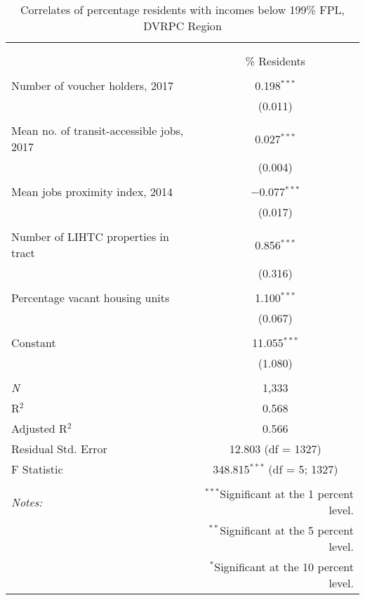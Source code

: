 \documentclass[paper=letterpaper, fontsize=11pt]{scrartcl}
\begin{document}
\begin{table}[!htbp] \centering 
	\caption{Correlates of percentage residents with incomes below 199\% FPL, DVRPC Region} 
		\label{} 
		\begin{tabular}{@{\extracolsep{5pt}}lc} 
			\\[-1.8ex]\hline 
			\hline \\[-1.8ex] 
			\\[-1.8ex] & \% Residents \\ 
			\hline \\[-1.8ex] 
			Number of voucher holders, 2017 & 0.198$^{***}$ \\ 
			& (0.011) \\ 
			& \\ 
			Mean no. of transit-accessible jobs, 2017 & 0.027$^{***}$ \\ 
			& (0.004) \\ 
			& \\ 
			Mean jobs proximity index, 2014 & $-$0.077$^{***}$ \\ 
			& (0.017) \\ 
			& \\ 
			Number of LIHTC properties in tract & 0.856$^{***}$ \\ 
			& (0.316) \\ 
			& \\ 
			Percentage vacant housing units & 1.100$^{***}$ \\ 
			& (0.067) \\ 
			& \\ 
			Constant & 11.055$^{***}$ \\ 
			& (1.080) \\ 
			& \\ 
			\textit{N} & 1,333 \\ 
			R$^{2}$ & 0.568 \\ 
			Adjusted R$^{2}$ & 0.566 \\ 
			Residual Std. Error & 12.803 (df = 1327) \\ 
			F Statistic & 348.815$^{***}$ (df = 5; 1327) \\ 
			\hline 
			\hline \\[-1.8ex] 
			\textit{Notes:} & \multicolumn{1}{r}{$^{***}$Significant at the 1 percent level.} \\ 
			& \multicolumn{1}{r}{$^{**}$Significant at the 5 percent level.} \\ 
			& \multicolumn{1}{r}{$^{*}$Significant at the 10 percent level.} \\ 
		\end{tabular} 
	\end{table}
\end{document}
